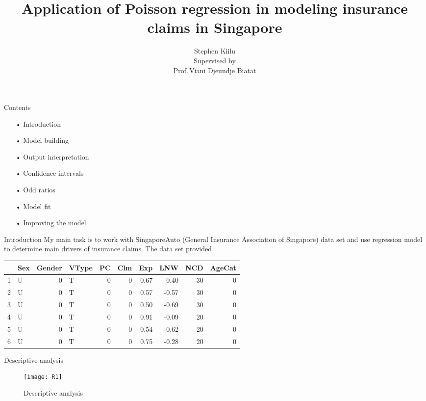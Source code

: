 \documentclass[11pt]{beamer}
\title{Application of Poisson regression in modeling insurance claims in Singapore}
\author{Stephen Kiilu\\ Supervised by\\ Prof.\,Viani Djeundje Biatat}
\begin{document}
\begin{frame}
\titlepage
\end{frame}


\begin{frame}{Contents}
\begin{itemize}
\item[•]Introduction
\item[•]Model building
\item[•]Output interpretation
\item[•]Confidence intervals
\item[•]Odd ratios
\item[•]Model fit
\item[•]Improving the model
\end{itemize}
\end{frame}
\begin{frame}{Introduction}
My main task is to work with SingaporeAuto (General Insurance Association of Singapore) data set and use regression model to determine main drivers of insurance claims.
The data set provided
\begin{table}[H]
\centering
\begin{tabular}{rlrlrrrrrr}
  \hline
 & Sex & Gender & VType & PC & Clm & Exp & LNW & NCD & AgeCat \\ 
  \hline
1 & U &   0 & T &   0 &   0 & 0.67 & -0.40 &  30 &   0 \\ 
  2 & U &   0 & T &   0 &   0 & 0.57 & -0.57 &  30 &   0 \\ 
  3 & U &   0 & T &   0 &   0 & 0.50 & -0.69 &  30 &   0 \\ 
  4 & U &   0 & T &   0 &   0 & 0.91 & -0.09 &  20 &   0 \\ 
  5 & U &   0 & T &   0 &   0 & 0.54 & -0.62 &  20 &   0 \\ 
  6 & U &   0 & T &   0 &   0 & 0.75 & -0.28 &  20 &   0 \\ 
   \hline
\end{tabular}
\end{table}
\end{frame}
\begin{frame}{Descriptive analysis}
\begin{figure}[H]
\texttt{[image: R1]}
\centering
\caption{Descriptive analysis}
\end{figure}
\end{frame}
\end{document}
